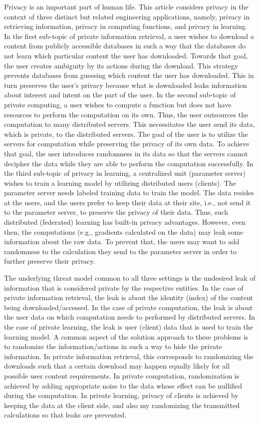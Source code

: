\documentclass[12pt,draftcls,onecolumn]{IEEEtran}
\begin{document}
Privacy is an important part of human life. This article considers privacy in the context of three distinct but related engineering applications, namely, privacy in retrieving information, privacy in computing functions, and privacy in learning. In the first sub-topic of private information retrieval, a user wishes to download a content from publicly accessible databases in such a way that the databases do not learn which particular content the user has downloaded. Towards that goal, the user creates ambiguity by its actions during the download. This strategy prevents databases from guessing which content the user has downloaded. This in turn preserves the user's privacy because what is downloaded leaks information about interest and intent on the part of the user. In the second sub-topic of private computing, a user wishes to compute a function but does not have resources to perform the computation on its own. Thus, the user outsources the computation to many distributed servers. This necessitates the user send its data, which is private, to the distributed servers. The goal of the user is to utilize the servers for computation while preserving the privacy of its own data. To achieve that goal, the user introduces randomness in its data so that the servers cannot decipher the data while they are able to perform the computation successfully. In the third sub-topic of privacy in learning, a centralized unit (parameter server) wishes to train a learning model by utilizing distributed users (clients). The parameter server needs labeled training data to train the model. The data resides at the users, and the users prefer to keep their data at their site, i.e., not send it to the parameter server, to preserve the privacy of their data. Thus, such distributed (federated) learning has built-in privacy advantages. However, even then, the computations (e.g., gradients calculated on the data) may leak some information about the raw data. To prevent that, the users may want to add randomness to the calculation they send to the parameter server in order to further preserve their privacy.      

The underlying threat model common to all three settings is the undesired leak of information that is considered private by the respective entities. In the case of private information retrieval, the leak is about the identity (index) of the content being downloaded/accessed. In the case of private computation, the leak is about the user data on which computation needs to performed by distributed servers. In the case of private learning, the leak is user (client) data that is used to train the learning model. A common aspect of the solution approach to these problems is to randomize the information/actions in such a way to hide the private information. In private information retrieval, this corresponds to randomizing the downloads such that a certain download may happen equally likely for all possible user content requirements. In private computation, randomization is achieved by adding appropriate noise to the data whose effect can be nullified during the computation. In private learning, privacy of clients is achieved by keeping the data at the client side, and also my randomizing the transmitted calculations so that leaks are prevented.  
\end{document}
